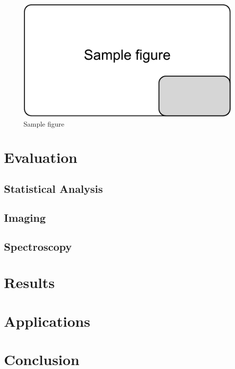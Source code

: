 \documentclass[11pt,sigconf]{acmart}
\begin{document}
\begin{figure}[htbp]
  \centering
  \includegraphics[scale=0.5]{sample-figure}
  \caption{Sample figure}
  \label{fig:sample}
\end{figure}




\section{Evaluation}

 
\subsection{Statistical Analysis}


\subsection{Imaging}


\subsection{Spectroscopy}


\section{Results}





\section{Applications}




\section{Conclusion}






 
\end{document}
